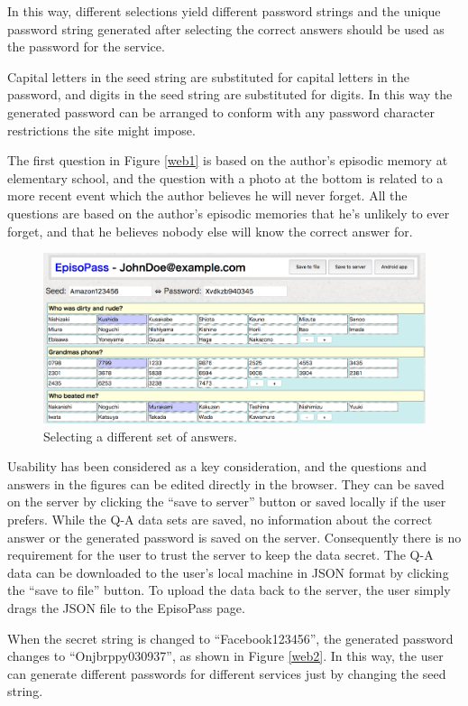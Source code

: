 \documentclass[runningheads,a4paper]{llncs}
\begin{document}
In this way, different selections yield different password strings and
the unique password string generated after selecting the correct answers should be
used as the password for the service.

Capital letters in the seed string are substituted for capital letters in the password,
and digits in the seed string are substituted for digits. In this way
the generated password can be arranged to conform with any password character restrictions
the site might impose.

The first question in Figure \ref{web1}
is based on the author's episodic memory at elementary school,
and the question with a photo at the bottom is related to a more recent event
which the author believes he will never forget.
All the questions are based on the author's episodic memories that he's unlikely to ever forget,
and that he believes nobody else will know the correct answer for.

\begin{figure}
\centering
\includegraphics[width=1.0\columnwidth]{figures/8447eaba1ede0f678b3ce6fea63681f3}
\caption{Selecting a different set of answers.}
\label{web11}
\end{figure}

Usability has been considered as a key consideration, and the questions 
and answers in the figures can be edited directly in the browser. They can be
saved on the server by clicking the ``save to server'' button or saved locally
if the user prefers.
While the Q-A data sets are saved, no information about the correct answer or the
generated password is saved on the server. Consequently there is no requirement for the user
to trust the server to keep the data secret.
The Q-A data can be downloaded to the user's local machine in JSON format 
by clicking the ``save to file'' button. To upload the data back to the server, the user
simply drags the JSON file to the EpisoPass page.

When the secret string is changed to ``\textsf{Facebook123456}'',
the generated password changes to ``\textsf{Onjbrppy030937}'',
as shown in Figure \ref{web2}.
In this way, the user can generate different passwords for
different services just by changing the seed string.
\end{document}
